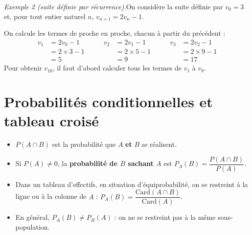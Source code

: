 \documentclass[10pt,a4paper]{article}
\begin{document}
\begin{bloc}
\textit{Exemple 2 (suite définie par récurrence).}\enspace On considère la suite définie par \(v_0=3\) et, pour tout entier naturel \(n\), \(v_{n+1}=2v_n-1\).

\smallskip
On calcule les termes de proche en proche, chacun à partir du précédent :
\[
\begin{aligned}
v_1&=2v_0-1\\ &=2\times 3-1\\ &=5
\end{aligned}
\qquad
\begin{aligned}
v_2&=2v_1-1\\ &=2\times 5-1\\ &=9
\end{aligned}
\qquad
\begin{aligned}
v_3&=2v_2-1\\ &=2\times 9-1\\ &=17
\end{aligned}
\]
Pour obtenir \(v_{10}\), il faut d'abord calculer tous les termes de \(v_1\) à \(v_9\).
\end{bloc}

\section{Probabilités conditionnelles et tableau croisé} \label{annexe-proba-tableau}

\begin{bloc}
\begin{defis}
\begin{itemize}
    \item \(P(A\cap B)\) est la probabilité que \(A\) \textbf{et} \(B\) se réalisent.
    \item Si \(P(A)\neq 0\), la \textbf{probabilité de \(B\) sachant \(A\)} est \(P_A(B)=\dfrac{P(A\cap B)}{P(A)}\).
    \item Dans un tableau d'effectifs, en situation d'équiprobabilité, on se restreint à la ligne ou à la colonne de \(A\) : \(P_A(B)=\dfrac{\mathrm{Card}(A\cap B)}{\mathrm{Card}(A)}\).
    \item En général, \(P_A(B)\neq P_B(A)\) : on ne se restreint pas à la même sous-population.
\end{itemize}
\end{defis}
\end{bloc}
\end{document}
